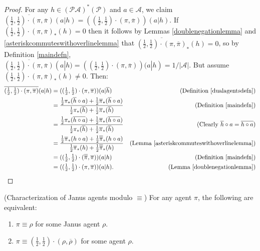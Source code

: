 \documentclass[runningheads]{llncs}
\begin{document}
\begin{proof}
    For any $h\in(\mathcal P\mathcal A)^*(\mathcal P)$ and $a\in\mathcal A$,
    we claim
    $\overline{(\frac12,\frac12)\cdot(\pi,\overline{\pi})}(a|h)
    =((\frac12,\frac12)\cdot(\pi,\overline{\pi}))(a|h)$.
    If $(\frac12,\frac12)\cdot(\pi,\overline\pi)_*(h)=0$
    then it follows by Lemmas \ref{doublenegationlemma} and
    \ref{asteriskcommuteswithoverlinelemma} that
    $\overline{(\frac12,\frac12)\cdot(\pi,\overline\pi)}_*(h)=0$,
    so by Definition \ref{maindefn},
    $\overline{(\frac12,\frac12)\cdot(\pi,\overline{\pi})}(a|h)
    =((\frac12,\frac12)\cdot(\pi,\overline{\pi}))(a|h)=1/|\mathcal A|$.
    But assume $(\frac12,\frac12)\cdot(\pi,\overline\pi)_*(h)\not=0$.
    Then:
    \begin{align*}
        \overline{(\mbox{$\frac12$},\mbox{$\frac12$})\cdot(\pi,\overline{\pi})}(a|h)
        &= ((\mbox{$\frac12$},\mbox{$\frac12$})\cdot(\pi,\overline{\pi}))(a|\overline h)
            &\mbox{(Definition \ref{dualagentsdefn})}\\
        &= \frac
            {\frac12\pi_*(\overline h\circ a)+\frac12\overline\pi_*(\overline h\circ a)}
            {\frac12\pi_*(\overline h)+\frac12\overline\pi_*(\overline h)}
            &\mbox{(Definition \ref{maindefn})}\\
        &= \frac
            {\frac12\pi_*(\overline{h\circ a})+\frac12\overline\pi_*(\overline{h\circ a})}
            {\frac12\pi_*(\overline h)+\frac12\overline\pi_*(\overline h)}
            &\mbox{(Clearly $\overline h\circ a=\overline{h\circ a}$)}\\
        &= \frac
            {\frac12\overline\pi_*(h\circ a)+\frac12\overline{\overline\pi}_*(h\circ a)}
            {\frac12\overline\pi_*(h)+\frac12\overline{\overline\pi}_*(h)}
            &\mbox{(Lemma \ref{asteriskcommuteswithoverlinelemma})}\\
        &= ((\mbox{$\frac12$},\mbox{$\frac12$})
            \cdot(\overline{\overline\pi},\overline\pi))(a|h)
            &\mbox{(Definition \ref{maindefn})}\\
        &= ((\mbox{$\frac12$},\mbox{$\frac12$})\cdot(\pi,\overline\pi))(a|h).
            &\mbox{(Lemma \ref{doublenegationlemma})}
    \end{align*}
\end{proof}

\begin{proposition}
    (Characterization of Janus agents modulo $\equiv$)
    For any agent $\pi$, the following are equivalent:
    \begin{enumerate}
        \item $\pi\equiv\rho$ for some Janus agent $\rho$.
        \item $\pi\equiv(\frac12,\frac12)\cdot(\rho,\overline{\rho})$
            for some agent $\rho$.
    \end{enumerate}
\end{proposition}
\end{document}
